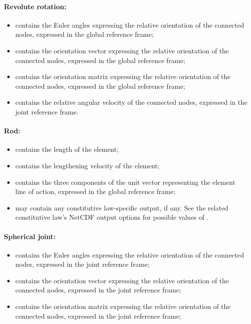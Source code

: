 \paragraph{Revolute rotation:}
\begin{itemize}
\item {} contains the Euler angles 
  expressing the relative orientation of the connected nodes, expressed in 
  the global reference frame;
\item {} contains the orientation vector
  expressing the relative orientation of the connected nodes, expressed in 
  the global reference frame;
\item {} contains the orientation matrix
  expressing the relative orientation of the connected nodes, expressed in 
  the global reference frame;
\item {} contains the relative angular
  velocity of the connected nodes, expressed in the joint reference frame.
\end{itemize}

\paragraph{Rod:}
\begin{itemize}
\item {} contains the length of the
  element;
\item {} contains the lengthening
  velocity of the element;
\item {} contains the three components of
  the unit vector representing the element line of action, expressed 
  in the global reference frame;
\item {} may contain any constitutive law-specific output, if any.
  See the related constitutive law's NetCDF output options for possible values of .
\end{itemize}

\paragraph{Spherical joint:}
\begin{itemize}
\item {} contains the Euler angles 
  expressing the relative orientation of the connected nodes, expressed in 
  the joint reference frame;
\item {} contains the orientation vector
  expressing the relative orientation of the connected nodes, expressed in 
  the joint reference frame;
\item {} contains the orientation matrix
  expressing the relative orientation of the connected nodes, expressed in 
  the joint reference frame;
\end{itemize}

